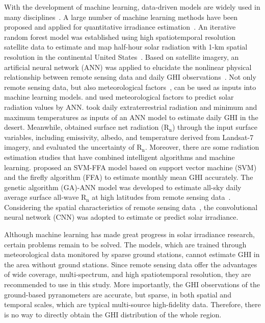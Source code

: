 \documentclass[review]{elsarticle}
\begin{document}
With the development of machine learning, data-driven models are widely used in many disciplines~\citep{Alex6707742, Kumari20211890085, KUMARI2021123285, KUMARI2021117061, LI2022102926, GEORGANOS2022103013, WALDELAND2022102840, LI2023103098, ISHIKAWA2023103215}.
A large number of machine learning methods have been proposed and applied for quantitative irradiance estimation~\citep{HUANG2019111371, KUMARI2021128566, ZHOU2021113960}.
An iterative random forest model was established using high spatiotemporal resolution satellite data to estimate and map half-hour solar radiation with 1-km spatial resolution in the continental United States~\citep{CHEN2021916}.
Based on satellite imagery, an artificial neural network (ANN) was applied to elucidate the nonlinear physical relationship between remote sensing data and daily GHI observations~\citep{LU20113179, QUESADARUIZ2015494}.
Not only remote sensing data, but also meteorological factors~\citep{QUEJ201762}, can be used as inputs into machine learning models.
\citet{LINARESRODRIGUEZ20115356} and \citet{WANG2016384} used meteorological factors to predict solar radiation values by ANN.
\citet{MARZO2017303} took daily extraterrestrial radiation and minimum and maximum temperatures as inputs of an ANN model to estimate daily GHI in the desert.
Meanwhile, \citet{MIRA2016251} obtained surface net radiation ($\mathrm{R_{n}}$) through the input surface variables, including emissivity, albedo, and temperature derived from Landsat-7 imagery, and evaluated the uncertainty of $\mathrm{R_{n}}$.
Moreover, there are some radiation estimation studies that have combined intelligent algorithms and machine learning.
\citet{OLATOMIWA2015632} proposed an SVM-FFA model based on support vector machine (SVM) and the firefly algorithm (FFA) to estimate monthly mean GHI accurately.
The genetic algorithm (GA)-ANN model was developed to estimate all-sky daily average surface all-wave $\mathrm{R_{n}}$ at high latitudes from remote sensing data~\citep{WANG201531, CHEN2020111842}.
Considering the spatial characteristics of remote sensing data~\citep{JIANG2019109327, JIANG2020115178, Yeom_2020, Jang14081840, Xu20222315, Kumaresan2022v1}, the convolutional neural network (CNN) was adopted to estimate or predict solar irradiance.

Although machine learning has made great progress in solar irradiance research, certain problems remain to be solved.
The models, which are trained through meteorological data monitored by sparse ground stations, cannot estimate GHI in the area without ground stations.
Since remote sensing data offer the advantages of wide coverage, multi-spectrum, and high spatiotemporal resolution, they are recommended to use in this study.
More importantly, the GHI observations of the ground-based pyranometers are accurate, but sparse, in both spatial and temporal scales, which are typical multi-source high-fidelity data.
Therefore, there is no way to directly obtain the GHI distribution of the whole region.
\end{document}
